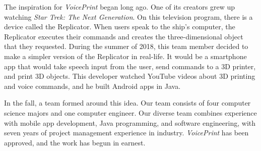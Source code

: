 The inspiration for \textit{VoicePrint} began long ago. One of its creators grew up watching \textit{Star Trek: The Next Generation}. On this television program, there is a device called the Replicator. When users speak to the ship's computer, the Replicator executes their commands and creates the three-dimensional object that they requested. During the summer of 2018, this team member decided to make a simpler version of the Replicator in real-life. It would be a smartphone app that would take speech input from the user, send commands to a 3D printer, and print 3D objects. This developer watched YouTube videos about 3D printing and voice commands, and he built Android apps in Java.

In the fall, a team formed around this idea. Our team consists of four computer science majors and one computer engineer. Our diverse team combines experience with mobile app development, Java programming, and software engineering, with seven years of project management experience in industry. \textit{VoicePrint} has been approved, and the work has begun in earnest.